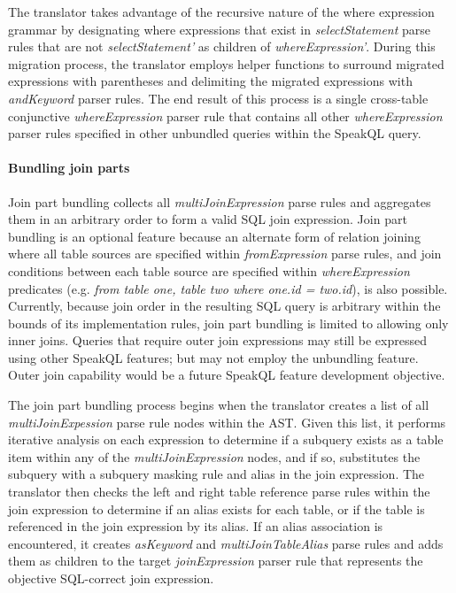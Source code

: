 The translator takes advantage of the recursive nature of the where expression grammar by designating where expressions that exist in \emph{selectStatement} parse rules that are not \emph{selectStatement'} as children of \emph{whereExpression'}. During this migration process, the translator employs helper functions to surround migrated expressions with parentheses and delimiting the migrated expressions with \emph{andKeyword} parser rules. The end result of this process is a single cross-table conjunctive \emph{whereExpression} parser rule that contains all other \emph{whereExpression} parser rules specified in other unbundled queries within the SpeakQL query. 

\paragraph{Bundling join parts}

Join part bundling collects all \emph{multiJoinExpression} parse rules and aggregates them in an arbitrary order to form a valid SQL join expression. Join part bundling is an optional feature because an alternate form of relation joining where all table sources are specified within \emph{fromExpression} parse rules, and join conditions between each table source are specified within \emph{whereExpression} predicates (e.g. \emph{from table one, table two where one.id = two.id}), is also possible. Currently, because join order in the resulting SQL query is arbitrary within the bounds of its implementation rules, join part bundling is limited to allowing only inner joins. Queries that require outer join expressions may still be expressed using other SpeakQL features; but may not employ the unbundling feature. Outer join capability would be a future SpeakQL feature development objective.


The join part bundling process begins when the translator creates a list of all \emph{multiJoinExpession} parse rule nodes within the AST. Given this list, it performs iterative analysis on each expression to determine if a subquery exists as a table item within any of the \emph{multiJoinExpression} nodes, and if so, substitutes the subquery with a subquery masking rule and alias in the join expression. The translator then checks the left and right table reference parse rules within the join expression to determine if an alias exists for each table, or if the table is referenced in the join expression by its alias. If an alias association is encountered, it creates \emph{asKeyword} and \emph{multiJoinTableAlias} parse rules and adds them as children to the target \emph{joinExpression} parser rule that represents the objective SQL-correct join expression.

